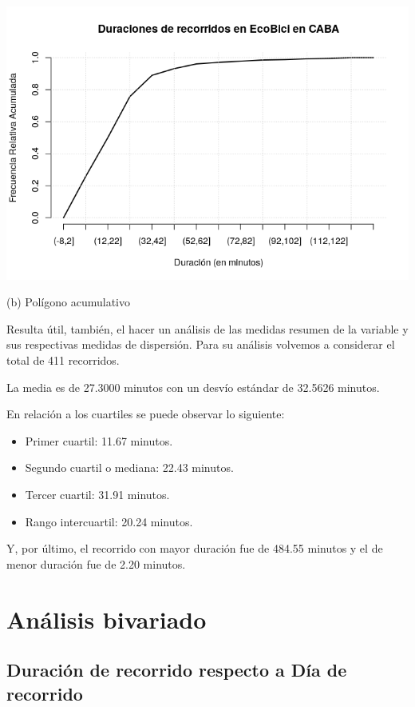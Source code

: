 \documentclass[11pt]{article}
\begin{document}
        \begin{center}
          \includegraphics[scale=0.55]{PoligAcumDuracion.png}
          \vspace{-4mm}
      
          (b) Pol\'igono acumulativo
        \end{center}

        Resulta \'util, tambi\'en, el hacer un an\'alisis de las medidas resumen de la variable y sus respectivas medidas de dispersi\'on.
        Para su an\'alisis volvemos a considerar el total de 411 recorridos.

        La media es de 27.3000 minutos con un desv\'io est\'andar de 32.5626 minutos. 

        En relaci\'on a los cuartiles se puede observar lo siguiente:

        \begin{itemize}
          \item Primer cuartil: 11.67 minutos.
          \item Segundo cuartil o mediana: 22.43 minutos.
          \item Tercer cuartil: 31.91 minutos.
          \item Rango intercuartil: 20.24 minutos.
        \end{itemize}

        Y, por \'ultimo, el recorrido con mayor duraci\'on fue de 484.55 minutos y el de menor duraci\'on fue de 2.20 minutos.

        \section{An\'alisis bivariado}

        \subsection{Duraci\'on de recorrido respecto a D\'ia de recorrido}
        
\end{document}
